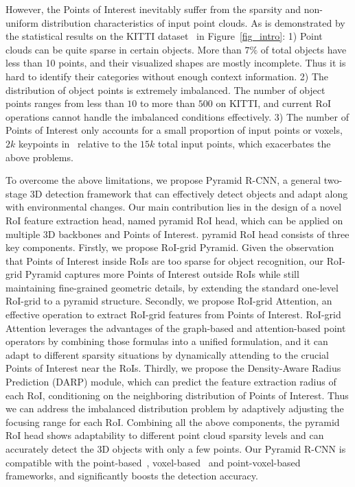 \documentclass[10pt,twocolumn,letterpaper]{article}
\begin{document}
However, the Points of Interest inevitably suffer from the sparsity and non-uniform distribution characteristics of input point clouds. As is demonstrated by the statistical results on the KITTI dataset~\cite{geiger2013vision} in Figure~\ref{fig_intro}: 1) Point clouds can be quite sparse in certain objects. More than $7\%$ of total objects have less than 10 points, and their visualized shapes are mostly incomplete. Thus it is hard to identify their categories without enough context information. 2) The distribution of object points is extremely imbalanced. The number of object points ranges from less than $10$ to more than $500$ on KITTI, and current RoI operations cannot handle the imbalanced conditions effectively. 3) The number of Points of Interest only accounts for a small proportion of input points or voxels, \eg $2k$ keypoints in~\cite{shi2020pv} relative to the $15k$ total input points, which exacerbates the above problems.

To overcome the above limitations, we propose Pyramid R-CNN, a general two-stage 3D detection framework that can effectively detect objects and adapt along with environmental changes. Our main contribution lies in the design of a novel RoI feature extraction head, named pyramid RoI head, which can be applied on multiple 3D backbones and Points of Interest. pyramid RoI head consists of three key components. Firstly, we propose RoI-grid Pyramid. Given the observation that Points of Interest inside RoIs are too sparse for object recognition, our RoI-grid Pyramid captures more Points of Interest outside RoIs while still maintaining fine-grained geometric details, by extending the standard one-level RoI-grid to a pyramid structure. Secondly, we propose RoI-grid Attention, an effective operation to extract RoI-grid features from Points of Interest. RoI-grid Attention leverages the advantages of the graph-based and attention-based point operators by combining those formulas into a unified formulation, and it can adapt to different sparsity situations by dynamically attending to the crucial Points of Interest near the RoIs. Thirdly, we propose the Density-Aware Radius Prediction (DARP) module, which can predict the feature extraction radius of each RoI, conditioning on the neighboring distribution of Points of Interest. Thus we can address the imbalanced distribution problem by adaptively adjusting the focusing range for each RoI. Combining all the above components, the pyramid RoI head shows adaptability to different point cloud sparsity levels and can accurately detect the 3D objects with only a few points. Our Pyramid R-CNN is compatible with the point-based~\cite{shi2019pointrcnn}, voxel-based~\cite{shi2020points} and point-voxel-based~\cite{shi2020pv} frameworks, and significantly boosts the detection accuracy.
\end{document}
